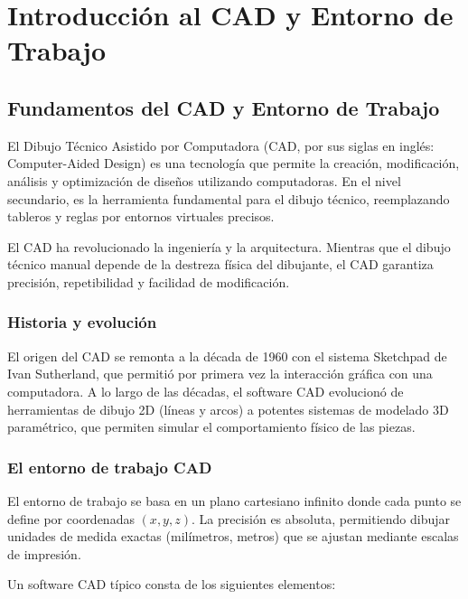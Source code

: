 \chapter{Introducción al CAD y Entorno de Trabajo}

\section{Fundamentos del CAD y Entorno de Trabajo}

El Dibujo Técnico Asistido por Computadora (CAD, por sus siglas en
inglés: Computer-Aided Design) es una tecnología que permite la
creación, modificación, análisis y optimización de diseños utilizando
computadoras. En el nivel secundario, es la herramienta fundamental
para el dibujo técnico, reemplazando tableros y reglas por entornos
virtuales precisos.

El CAD ha revolucionado la ingeniería y la arquitectura. Mientras que
el dibujo técnico manual depende de la destreza física del dibujante,
el CAD garantiza precisión, repetibilidad y facilidad de modificación.

\subsection{Historia y evolución}

El origen del CAD se remonta a la década de 1960 con el sistema
Sketchpad de Ivan Sutherland, que permitió por primera vez la
interacción gráfica con una computadora. A lo largo de las décadas, el
software CAD evolucionó de herramientas de dibujo 2D (líneas y arcos)
a potentes sistemas de modelado 3D paramétrico, que permiten simular
el comportamiento físico de las piezas.

\subsection{El entorno de trabajo CAD}

El entorno de trabajo se basa en un plano cartesiano infinito donde
cada punto se define por coordenadas $(x, y, z)$. La precisión es
absoluta, permitiendo dibujar unidades de medida exactas (milímetros,
metros) que se ajustan mediante escalas de impresión.

Un software CAD típico consta de los siguientes elementos:

